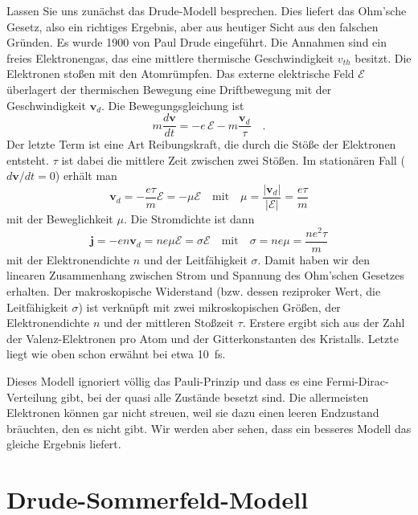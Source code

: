 Lassen Sie uns zunächst das Drude-Modell besprechen. Dies liefert das Ohm'sche Gesetz, also ein richtiges Ergebnis, aber aus heutiger Sicht aus den falschen Gründen. Es wurde 1900 von Paul Drude eingeführt. Die Annahmen sind ein freies Elektronengas, das eine mittlere thermische Geschwindigkeit $v_{th}$ besitzt. Die Elektronen stoßen mit den Atomrümpfen. Das externe elektrische Feld $\mathcal{E}$ überlagert der thermischen Bewegung eine Driftbewegung mit der Geschwindigkeit $\mathbf{v}_d$. Die Bewegungsgleichung ist 
\begin{equation}
   m \frac{d \mathbf{v}}{dt} = -e \, \mathcal{E} - m \frac{\mathbf{v}_d}{\tau} \quad .
\end{equation}
Der letzte Term ist eine Art Reibungskraft, die durch die Stöße der Elektronen entsteht. $\tau$ ist dabei die mittlere Zeit zwischen zwei Stößen. Im stationären Fall 
($d \mathbf{v} / dt = 0$) erhält man   
\begin{equation}
   \mathbf{v}_d = - \frac{e \tau}{m} \mathcal{E} = - \mu \mathcal{E} 
   \quad \text{mit} \quad
    \mu = \frac{| \mathbf{v}_d |}{|\mathcal{E}|} = \frac{e \tau}{m}
\end{equation}
mit der Beweglichkeit $\mu$. Die Stromdichte ist dann
\begin{equation}
   \mathbf{j} = -e n  \mathbf{v}_d = n e \mu \mathcal{E} = \sigma \mathcal{E} 
   \quad \text{mit} \quad 
   \sigma = n e \mu  = \frac{n e^2 \tau}{m}
\end{equation}
mit der Elektronendichte $n$ und der Leitfähigkeit $\sigma$. Damit haben wir den linearen Zusammenhang zwischen Strom und Spannung des Ohm'schen Gesetzes erhalten. Der makroskopische Widerstand (bzw. dessen reziproker Wert, die Leitfähigkeit $\sigma$) ist verknüpft mit zwei mikroskopischen  Größen, der Elektronendichte $n$ und der mittleren Stoßzeit $\tau$. Erstere ergibt sich aus der Zahl der Valenz-Elektronen pro Atom und der Gitterkonstanten des Kristalls. Letzte liegt wie oben schon erwähnt bei etwa 10~fs.

Dieses Modell ignoriert völlig das Pauli-Prinzip und dass es eine Fermi-Dirac-Verteilung gibt, bei der quasi alle Zustände besetzt sind. Die allermeisten Elektronen können gar nicht streuen, weil sie dazu einen leeren Endzustand bräuchten, den es nicht gibt. Wir werden aber sehen, dass ein besseres Modell das gleiche Ergebnis liefert.

\section{Drude-Sommerfeld-Modell}

